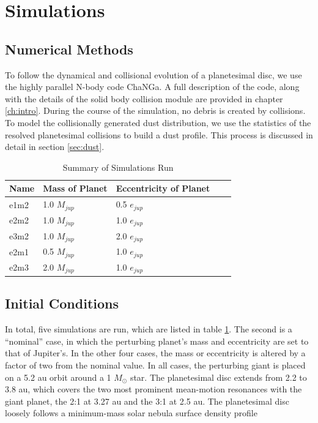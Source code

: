 \section{Simulations} \label{sec:sims}

\subsection{Numerical Methods}\label{sec:methods}

To follow the dynamical and collisional evolution of a planetesimal disc, we use the highly parallel N-body code {\sc ChaNGa}. A full 
description of the code, along with the details of the solid body collision module are provided in chapter \ref{ch:intro}. During the course 
of the simulation, no debris is created by collisions. To model the collisionally generated dust distribution, we use the statistics of the 
resolved planetesimal collisions to build a dust profile. This process is discussed in detail in section \ref{sec:dust}.

\begin{table}
\begin{center}
\caption{Summary of Simulations Run}
\begin{tabular}{lllll} \hline \hline
Name     & Mass of Planet & Eccentricity of Planet &  &  \\ \hline
e1m2 & 1.0 $M_{jup}$                     & 0.5 $e_{jup}$                            &  &  \\
e2m2      & 1.0 $M_{jup}$                     & 1.0 $e_{jup}$                             &  &  \\
e3m2 & 1.0 $M_{jup}$                     & 2.0 $e_{jup}$                             &  &  \\
e2m1 & 0.5 $M_{jup}$                   & 1.0 $e_{jup}$                             &  &  \\
e2m3 & 2.0 $M_{jup}$                     & 1.0 $e_{jup}$                             &  &  \\ \hline
\end{tabular}
\label{tab:sims}
\end{center}
\end{table}

\subsection{Initial Conditions}\label{sec:ics}

In total, five simulations are run, which are listed in table \ref{tab:sims}. The second is a ``nominal'' case, in which the perturbing 
planet's mass and eccentricity are set to that of Jupiter's. In the other four cases, the mass or eccentricity is altered by a factor of 
two from the nominal value. In all cases, the perturbing giant is placed on a 5.2 au orbit around a 1 $M_{\odot}$ star. The 
planetesimal disc extends from 2.2 to 3.8 au, which covers the two most prominent mean-motion resonances with the giant 
planet, the 2:1 at 3.27 au and the 3:1 at 2.5 au. The planetesimal disc loosely follows a minimum-mass solar nebula surface 
density profile \cite{hayashi81}

